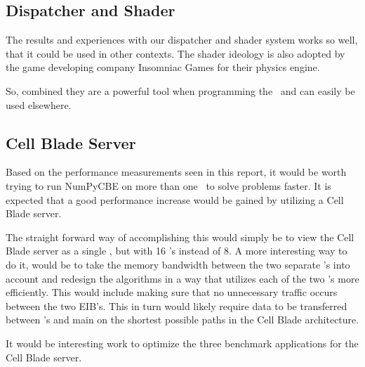 \subsection{Dispatcher and Shader}

The results and experiences with our dispatcher and shader system
works so well, that it could be used in other contexts. The shader
ideology is also adopted by the game developing company Insomniac
Games for their physics engine.

So, combined they are a powerful tool when programming the \CBE\ and
can easily be used elsewhere.

\subsection{Cell Blade Server}

Based on the performance measurements seen in this report, it would
be worth trying to run NumPyCBE on more than one \CBE\ to solve problems faster.
It is expected that a good performance increase would be gained by
utilizing a Cell Blade server.

The straight forward way of accomplishing this would simply be to
view the Cell Blade server as a single \CBE{}, but with 16 \SPE{}'s instead
of 8. A more interesting way to do it, would be to take the memory bandwidth
between the two separate \CBE{}'s into account and redesign the algorithms in
a way that utilizes each of the two \CBE{}'s more efficiently. This would include
making sure that no unnecessary traffic occurs between the two EIB's.
This in turn would likely require data to be transferred between \SPE{}'s and main
on the shortest possible paths in the Cell Blade architecture.

It would be interesting work to optimize the three benchmark applications for the
Cell Blade server.
